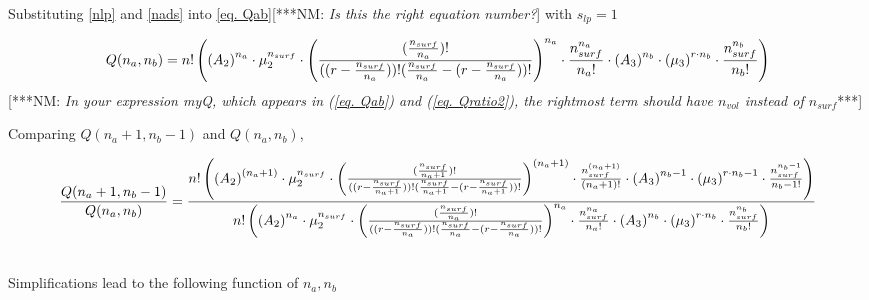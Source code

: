 \documentclass[10pt,letterpaper]{article}
\newcommand{\nads}[1]{\ensuremath{\frac{n_{surf}}{#1}}}
\newcommand{\nlp}[1]{\ensuremath{r-\nads{#1}}}
\newcommand{\myQ}[4]{
	\ensuremath{	
		n!
		\left(
		\left(
		A_2
		\right)^{#1}
		\cdot 
		\mu_{2}^{n_{surf}} 
		\cdot 
		\left(
		\frac{(#3)!}{(#4)!(#3-#4)!}
		\right)^{#1}
		\cdot
		\frac{n_{surf}^{#1}}{#1!}
		\cdot
		\left(
		A_3
		\right)^{#2}
		\cdot 
		\left(
		\mu_{3}
		\right)^{r\cdotp #2}
		\cdot
		\frac{
			n_{surf}^{#2}
		}{
			#2!
		}
		\right)}}
\newcommand{\myQcancel}[4]{
		\ensuremath{	
			\cancel{n!}
			\cdot
			\left(
			\left(
			A_2
			\right)^{~~\cancel{#1}}
			\cdot 
			\cancel{\mu_{2}^{n_{surf}}}
			\cdot 
			\left(
			\frac{\cancel{(#3)!}}{\cancel{(#4)!}\cancel{(#3-#4)!}}
			\right)^{~~\cancel{#1}}
			\cdot
			\frac{n_{surf}^{~~\cancel{#1}}}{\cancel{#1!}}
			\cdot
			\left(
			A_3
			\right)^{~~\cancel{#2}}
			\cdot 
			\left(
			\mu_{3}
			\right)^{~~\cancel{r\cdotp #2}}
			\cdot
			\frac{
				n_{vol}^{~~\cancel{#2}}
			}{
				\cancel{#2!}
			}
			\right)}}
\begin{document}
\noindent Substituting \ref{nlp} and \ref{nads} into \ref{eq. Qab}[***NM:  \textit{Is this the right
equation number?}] with $s_{lp}=1$

\begin{equation}
	Q(n_a,n_b)=\myQ{n_a}{n_b}{\nads{n_a}}{(\nlp{n_a})}
	\label{eq. Qab}
\end{equation}
[***NM:  \textit{In your expression myQ, which 
appears in (\ref{eq. Qab}) and 
(\ref{eq. Qratio2}), the rightmost term should have
$n_{vol}$ instead of $n_{surf}$}***]


\noindent Comparing $Q(n_a+1,n_b-1)$ and $Q(n_a,n_b)$, %

\begin{equation}
	\frac{Q(n_a+1,n_b-1)}{Q(n_a,n_b)}=
	\frac{
		\myQ{(n_a+1)}{n_b-1}{\nads{n_a+1}}{(\nlp{n_a+1})}
	}{
		\myQ{n_a}{n_b}{\nads{n_a}}{(\nlp{n_a})}
	}
	\label{eq. Qratio2}
\end{equation}

\text{}\\
Simplifications lead to the following function of $n_a,n_b$

\end{document}

